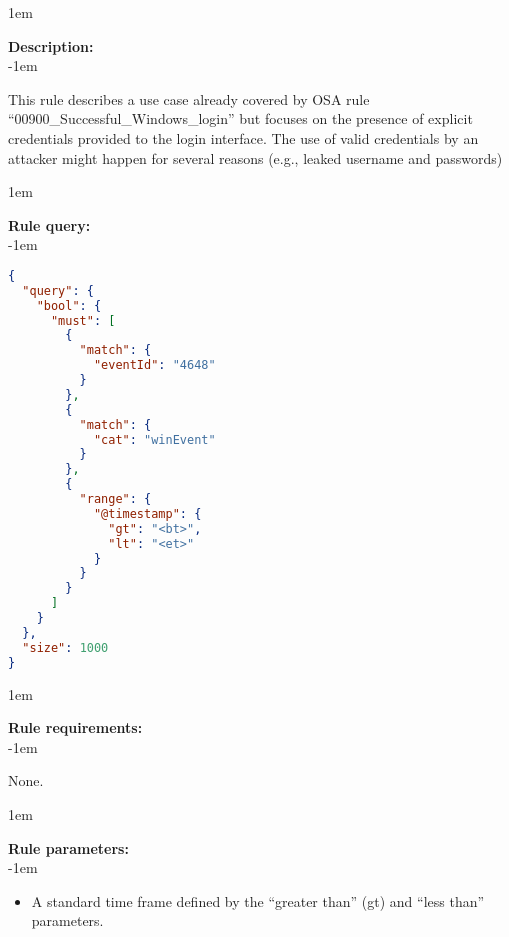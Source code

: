 \openup 1em

{\bf Description:} \\

\openup -1em
\vspace{-2em}


This rule describes a use case already covered by OSA rule ``00900\_Successful\_Windows\_login'' but focuses on the presence of explicit credentials provided to the login interface. The use of valid credentials by an attacker might happen for several reasons (e.g., leaked username and passwords)

\openup 1em

{\bf Rule query:} \\

\openup -1em
\vspace{-2em}

\begin{lstlisting}[language=json,firstnumber=1]
{
  "query": {
    "bool": {
      "must": [
        {
          "match": {
            "eventId": "4648"
          }
        },
        {
          "match": {
            "cat": "winEvent"
          }
        },
        {
          "range": {
            "@timestamp": {
              "gt": "<bt>",
              "lt": "<et>"
            }
          }
        }
      ]
    }
  },
  "size": 1000
}
\end{lstlisting}

\openup 1em

{\bf Rule requirements:} \\

\openup -1em
\vspace{-2em}

None.

\openup 1em

{\bf Rule parameters:} \\

\openup -1em
\vspace{-2em}

\begin{itemize}
	\item A standard time frame defined by the ``greater than'' (gt) and ``less than'' parameters.
\end{itemize}

